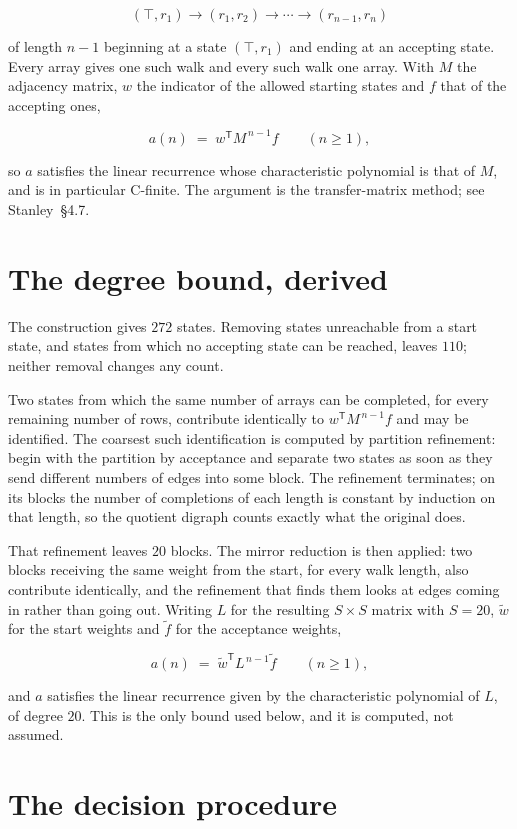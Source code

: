 \documentclass[11pt]{article}
\theoremstyle{definition}
\begin{document}
\[(\top,r_1) \to (r_1,r_2) \to \cdots \to (r_{n-1},r_n)\]

of length $n-1$ beginning at a state $(\top,r_1)$ and ending at an accepting state. Every array gives one such walk and every such walk one array. With $M$ the adjacency matrix, $w$ the indicator of the allowed starting states and $f$ that of the accepting ones,

\[a(n) \;=\; w^{\mathsf T} M^{\,n-1} f \qquad (n \ge 1),\]

so $a$ satisfies the linear recurrence whose characteristic polynomial is that of $M$, and is in particular C-finite. The argument is the transfer-matrix method; see Stanley~\S4.7.

\section{The degree bound, derived}

The construction gives $272$ states. Removing states unreachable from a start state, and states from which no accepting state can be reached, leaves $110$; neither removal changes any count.

Two states from which the same number of arrays can be completed, for every remaining number of rows, contribute identically to $w^{\mathsf T}M^{\,n-1}f$ and may be identified. The coarsest such identification is computed by partition refinement: begin with the partition by acceptance and separate two states as soon as they send different numbers of edges into some block. The refinement terminates; on its blocks the number of completions of each length is constant by induction on that length, so the quotient digraph counts exactly what the original does.

That refinement leaves $20$ blocks. The mirror reduction is then applied: two blocks receiving the same weight from the start, for every walk length, also contribute identically, and the refinement that finds them looks at edges coming in rather than going out. Writing $L$ for the resulting $S \times S$ matrix with $S = 20$, $\tilde w$ for the start weights and $\tilde f$ for the acceptance weights,

\[a(n) \;=\; \tilde w^{\mathsf T} L^{\,n-1} \tilde f \qquad (n \ge 1),\]

and $a$ satisfies the linear recurrence given by the characteristic polynomial of $L$, of degree $20$. This is the only bound used below, and it is computed, not assumed.

\section{The decision procedure}
\end{document}
